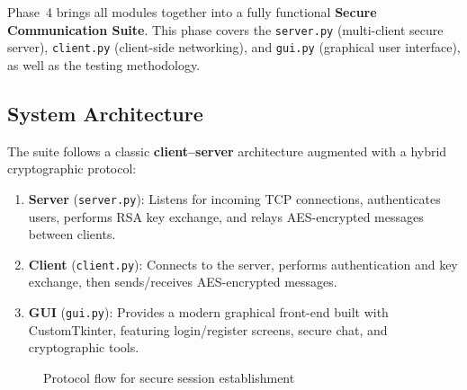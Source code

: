 \documentclass[12pt,a4paper]{article}
\begin{document}
Phase~4 brings all modules together into a fully functional \textbf{Secure Communication Suite}. This phase covers the \texttt{server.py} (multi-client secure server), \texttt{client.py} (client-side networking), and \texttt{gui.py} (graphical user interface), as well as the testing methodology.

\subsection{System Architecture}

The suite follows a classic \textbf{client--server} architecture augmented with a hybrid cryptographic protocol:

\begin{enumerate}
    \item \textbf{Server} (\texttt{server.py}): Listens for incoming TCP connections, authenticates users, performs RSA key exchange, and relays AES-encrypted messages between clients.
    \item \textbf{Client} (\texttt{client.py}): Connects to the server, performs authentication and key exchange, then sends/receives AES-encrypted messages.
    \item \textbf{GUI} (\texttt{gui.py}): Provides a modern graphical front-end built with CustomTkinter, featuring login/register screens, secure chat, and cryptographic tools.
\end{enumerate}

\begin{figure}[H]
\centering
{}
\caption{Protocol flow for secure session establishment}
\end{figure}
\end{document}
